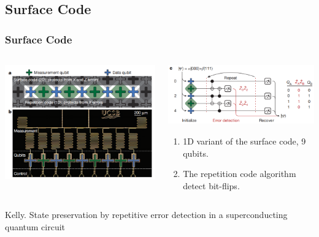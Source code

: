 \documentclass[aspectratio=169,10pt]{beamer}
\begin{document}
\subsection{Surface Code}
\begin{frame}
    \frametitle{Surface Code}
    \begin{columns}
        \begin{column}{0.5\textwidth}
            \centering
            \includegraphics[width=\columnwidth]{figure/surface.png}
        \end{column}
        \begin{column}{0.5\textwidth}
            \centering
            \includegraphics[width=\columnwidth]{figure/surface1.png}
            \begin{enumerate}
                \item 1D variant of the surface code, 9 qubits.
                \item The repetition code algorithm detect bit-flips.
            \end{enumerate}
        \end{column}
    \end{columns}
\tiny{Kelly. State preservation by repetitive error detection in a superconducting quantum circuit}
\end{frame}
\end{document}
